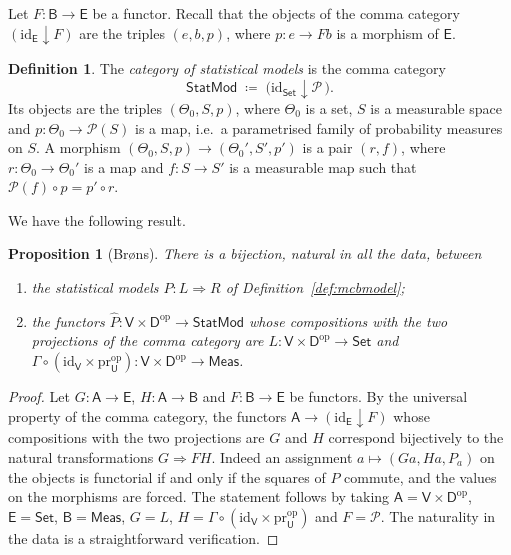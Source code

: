 \documentclass[11pt,a4paper]{article}
\theoremstyle{plain}
\newtheorem{proposition}[theorem]{Proposition}
\theoremstyle{definition}
\newtheorem{definition}[theorem]{Definition}
\theoremstyle{remark}
\newcommand{\cat}[1]{\mathsf{#1}}
\newcommand{\catU}{\cat{U}}
\newcommand{\catV}{\cat{V}}
\newcommand{\catD}{\cat{D}}
\newcommand{\Meas}{\cat{Meas}}
\newcommand{\Set}{\cat{Set}}
\newcommand{\Prb}{\mathcal{P}}
\newcommand{\op}{\mathrm{op}}
\newcommand{\id}{\mathrm{id}}
\newcommand{\pr}{\mathrm{pr}}
\newcommand{\StatMod}{\cat{StatMod}}
\begin{document}
Let $F \colon \cat{B} \to \cat{E}$ be a functor. Recall that the objects of the
comma category $(\id_{\cat E} \downarrow F)$ are the triples $(e, b, p)$, where
$p \colon e \to F b$ is a morphism of $\cat{E}$.

\begin{definition}\label{def:statmod}
The \emph{category of statistical models} is the comma category
\[
\StatMod \;\coloneqq\; \bigl(\id_{\Set} \downarrow \Prb\,\bigr).
\]
Its objects are the triples $(\Theta_0,S,p)$, where $\Theta_0$ is a set, $S$ is
a measurable space and $p \colon \Theta_0 \to \Prb(S)$ is a map, i.e.\ a
parametrised family of probability measures on $S$. A morphism
$(\Theta_0,S,p) \to (\Theta_0',S',p')$ is a pair $(r,f)$, where
$r \colon \Theta_0 \to \Theta_0'$ is a map and $f \colon S \to S'$ is a
measurable map such that $\Prb(f) \circ p = p' \circ r$.
\end{definition}

We have the following result.

\begin{proposition}[Br\o ns]\label{prop:brons}
There is a bijection, natural in all the data, between
\begin{enumerate}
\item the statistical models $P \colon L \Rightarrow R$ of
Definition~\ref{def:mcbmodel};
\item the functors $\widehat{P} \colon \catV \times \catD^{\op} \to \StatMod$
whose compositions with the two projections of the comma category are
$L \colon \catV \times \catD^{\op} \to \Set$ and
$\Gamma \circ (\id_{\catV} \times \pr_\catU^{\op}) \colon
\catV \times \catD^{\op} \to \Meas$.
\end{enumerate}
\end{proposition}

\begin{proof}
Let $G \colon \cat{A} \to \cat{E}$, $H \colon \cat{A} \to \cat{B}$ and
$F \colon \cat{B} \to \cat{E}$ be functors. By the universal property of the
comma category, the functors $\cat{A} \to (\id_{\cat E} \downarrow F)$ whose
compositions with the two projections are $G$ and $H$ correspond bijectively
to the natural transformations $G \Rightarrow F H$. Indeed an assignment
$a \mapsto (G a, H a, P_a)$ on the objects is functorial if and only if the
squares of $P$ commute, and the values on the morphisms are forced. The
statement follows by taking $\cat{A} = \catV \times \catD^{\op}$,
$\cat{E} = \Set$, $\cat{B} = \Meas$, $G = L$,
$H = \Gamma \circ (\id_{\catV} \times \pr_\catU^{\op})$ and $F = \Prb$. The
naturality in the data is a straightforward verification.
\end{proof}
\end{document}
